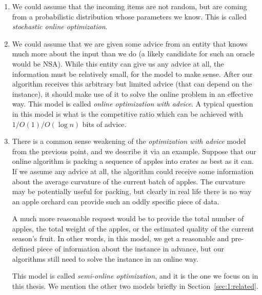 \begin{enumerate}

\item We could assume that the incoming items are not random, but
are coming from a probabilistic distribution whose parameters we know.
This is called \textit{stochastic online optimization}.

\item We could assume that we are given some advice from an entity
that knows much more about the input than we do (a likely candidate
for such an oracle would be NSA). While this entity can give us any
advice at all, the information must be relatively small, for the model
to make sense. After our algorithm receives this arbitrary but limited
advice (that can depend on the instance), it should make use of it to
solve the online problem in an effective way. This model is called
\textit{online optimization with advice}. A typical question in this
model is what is the competitive ratio which can be achieved with $1/
O(1) / O(\log n)$ bits of advice.

\item There is a common sense weakening of the \textit{optimization
with advice} model from the previous point, and we describe it
via an example. Suppose that our online algorithm is packing a
sequence of apples into crates as best as it can. If we assume any
advice at all, the algorithm could receive some information about the
average curvature of the current batch of apples. The curvature may
be potentially useful for packing, but clearly in real life there is no
way an apple orchard can provide such an oddly specific piece of data.

A much more reasonable request would be to provide the total number of
apples, the total weight of the apples, or the estimated quality of
the current season's fruit. In other words, in this model, we get a
reasonable and pre-defined piece of information about the instance in
advance, but our algorithms still need to solve the instance in an
online way.

This model is called \textit{semi-online optimization}, and it is the
one we focus on in this thesis. We mention the other two models briefly
in Section~\ref{sec:1:related}.

\end{enumerate}